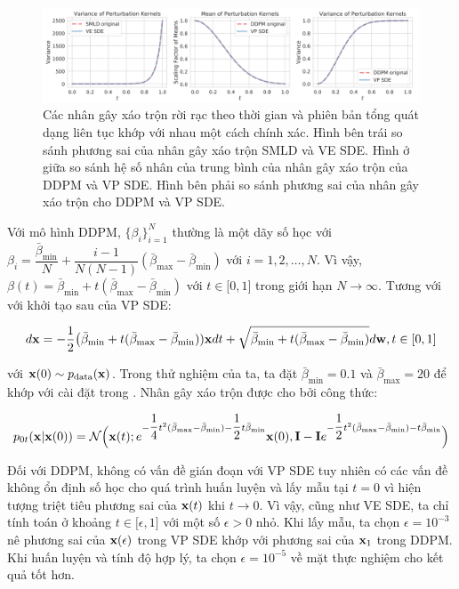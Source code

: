 \documentclass{article} %
\begin{document}
\begin{figure}[h!]
    \centering
    \includegraphics[width=0.9\linewidth]{figures/5.png}
    \caption{Các nhân gây xáo trộn rời rạc theo thời gian và phiên bản tổng quát dạng liên tục khớp với nhau một cách chính xác.
    Hình bên trái so sánh phương sai của nhân gây xáo trộn SMLD và VE SDE.
    Hình ở giữa so sánh hệ số nhân của trung bình của nhân gây xáo trộn của DDPM và VP SDE.
    Hình bên phải so sánh phương sai của nhân gây xáo trộn cho DDPM và VP SDE.}
    \label{fig:5}
\end{figure}

Với mô hình DDPM, $\lbrace \beta_i \rbrace_{i=1}^N$ thường là một dãy số học với $\beta_i = \dfrac{\bar{\beta}_{\min}}{N} + \dfrac{i-1}{N(N-1)}(\bar{\beta}_{\max}-\bar{\beta}_{\min})$ với $i=1, 2, \dots, N$.
Vì vậy, $\beta(t) = \bar{\beta}_{\min} + t (\bar{\beta}_{\max} - \bar{\beta}_{\min})$ với $t \in \lbrack 0, 1 \rbrack$ trong giới hạn $N \rightarrow \infty$.
Tương với với khởi tạo sau của VP SDE:

\begin{equation} \label{eq:32}
    d \bold{x} = -\dfrac{1}{2} \big( \bar{\beta}_{\min} + t (\bar{\beta}_{\max} - \bar{\beta}_{\min})) \bold{x} dt + \sqrt{\bar{\beta}_{\min} + t (\bar{\beta}_{\max} - \bar{\beta}_{\min})} d \bold{w}, t \in \lbrack 0, 1 \rbrack
\end{equation}

với $\bold{x}(0) \sim p_{\mathrm{data}}(\bold{x})$.
Trong thử nghiệm của ta, ta đặt $\bar{\beta}_{\min}=0.1$ và $\bar{\beta}_{\max}=20$ để khớp với cài đặt trong \citep{ho2020denoising}.
Nhân gây xáo trộn được cho bởi công thức:

\begin{equation} \label{eq:32}
    p_{0t} (\bold{x} \vert \bold{x}(0)) = \mathcal{N} \Big( \bold{x}(t); e^{-\dfrac{1}{4}t^2 (\bar{\beta}_{\max} - \bar{\beta}_{\min})-\dfrac{1}{2}t \bar{\beta}_{\min}} \bold{x}(0), \bold{I} - \bold{I} e^{-\dfrac{1}{2}t^2 (\bar{\beta}_{\max} - \bar{\beta}_{\min}) - t \bar{\beta}_{\min}} \Big)
\end{equation}

Đối với DDPM, không có vấn đề gián đoạn với VP SDE tuy nhiên có các vấn đề không ổn định số học cho quá trình huấn luyện và lấy mẫu tại $t=0$ vì hiện tượng triệt tiêu phương sai của $\bold{x}(t)$ khi $t \rightarrow 0$.
Vì vậy, cũng như VE SDE, ta chỉ tính toán ở khoảng $t \in \lbrack \epsilon, 1 \rbrack$ với một số $\epsilon > 0$ nhỏ.
Khi lấy mẫu, ta chọn $\epsilon = 10^{-3}$ nê phương sai của $\bold{x}(\epsilon)$ trong VP SDE khớp với phương sai của $\bold{x}_1$ trong DDPM.
Khi huấn luyện và tính độ hợp lý, ta chọn $\epsilon = 10^{-5}$ về mặt thực nghiệm cho kết quả tốt hơn.
\end{document}
